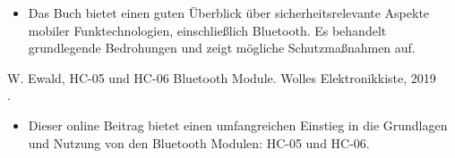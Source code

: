 \begin{itemize}
    \item Das Buch bietet einen guten Überblick über sicherheitsrelevante Aspekte mobiler Funktechnologien, einschließlich Bluetooth. Es behandelt grundlegende Bedrohungen und zeigt mögliche Schutzmaßnahmen auf.
\end{itemize}

W. Ewald, HC-05 und HC-06 Bluetooth Module. Wolles Elektronikkiste, 2019\\ .
\cite{WollesElektronikkiste:2019}

\begin{itemize}
    \item Dieser online Beitrag bietet einen umfangreichen Einstieg in die Grundlagen und Nutzung von den Bluetooth Modulen: HC-05 und HC-06.
\end{itemize}






